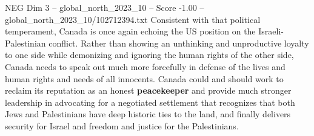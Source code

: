 \begin{textsample}{NEG Dim 3 – global\_north\_2023\_10 – Score -1.00 – global\_north\_2023\_10/102712394.txt}
Consistent with that political temperament, Canada is once again echoing the US position on the Israeli-Palestinian conflict.
Rather than showing an unthinking and unproductive loyalty to one side while demonizing and ignoring the human rights of the other side, Canada needs to speak out much more forcefully in defense of the lives and human rights and needs of all innocents.
Canada could and should work to reclaim its reputation as an honest \textbf{peacekeeper} and provide much stronger leadership in advocating for a negotiated settlement that recognizes that both Jews and Palestinians have deep historic ties to the land, and finally delivers security for Israel and freedom and justice for the Palestinians.

\end{textsample}
